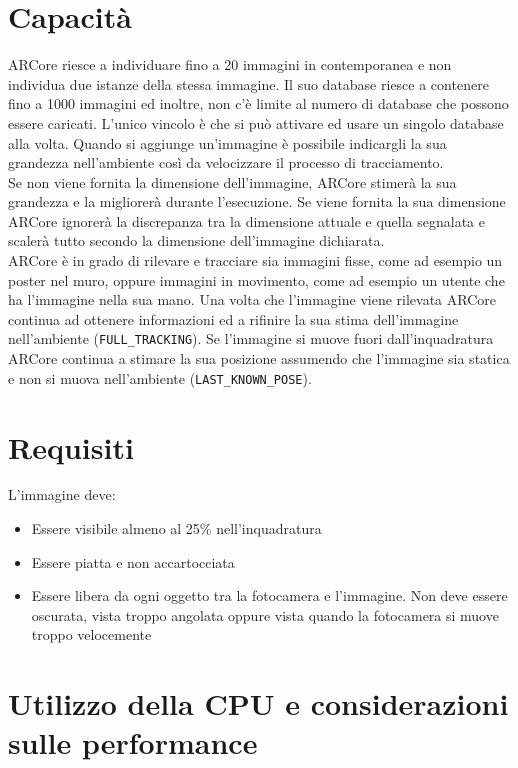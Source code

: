 \documentclass[crop=false, class=book]{standalone}
\begin{document}
	\section{Capacità}
	ARCore riesce a individuare fino a 20 immagini in contemporanea e non individua due istanze della stessa immagine. Il suo database riesce a contenere fino a 1000 immagini ed inoltre, non c’è limite al numero di database che possono essere caricati. L’unico vincolo è che si può attivare ed usare un singolo database alla volta. Quando si aggiunge un’immagine è possibile indicargli la sua grandezza nell’ambiente così da velocizzare il processo di tracciamento. \\
	\noindent
	Se non viene fornita la dimensione dell’immagine, ARCore stimerà la sua grandezza e la migliorerà durante l’esecuzione. Se viene fornita la sua dimensione ARCore ignorerà la discrepanza tra la dimensione attuale e quella segnalata e scalerà tutto secondo la dimensione dell’immagine dichiarata.\\
	\noindent
	ARCore è in grado di rilevare e tracciare sia immagini fisse, come ad esempio un poster nel muro, oppure immagini in movimento, come ad esempio un utente che ha l’immagine nella sua mano.
	Una volta che l’immagine viene rilevata ARCore continua ad ottenere informazioni ed a rifinire la sua stima dell’immagine nell’ambiente (\verb|FULL_TRACKING|).
	Se l’immagine si muove fuori dall’inquadratura ARCore continua a stimare la sua posizione assumendo che l’immagine sia statica e non si muova nell’ambiente (\verb|LAST_KNOWN_POSE|).

	\newpage
	\section{Requisiti}
	L’immagine deve:
	\begin{itemize}
		\item Essere visibile almeno al 25\% nell'inquadratura
		\item Essere piatta e non accartocciata
		\item Essere libera da ogni oggetto tra la fotocamera e l'immagine. Non deve essere oscurata, vista troppo angolata oppure vista quando la fotocamera si muove troppo velocemente
	\end{itemize}

	
	\section{Utilizzo della CPU e considerazioni sulle performance}
	
\end{document}
